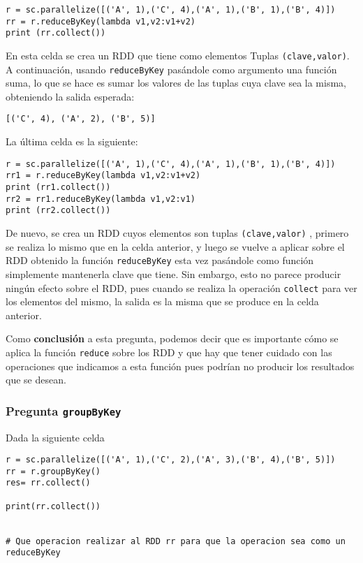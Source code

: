 \documentclass[11pt]{article}
\def\inline{\lstinline[basicstyle=\ttfamily,keywordstyle={}]}
\begin{document}
\begin{verbatim}
r = sc.parallelize([('A', 1),('C', 4),('A', 1),('B', 1),('B', 4)])
rr = r.reduceByKey(lambda v1,v2:v1+v2)
print (rr.collect())
\end{verbatim}

En esta celda se crea un RDD que tiene como elementos Tuplas \inline{(clave,valor)}. A continuación, usando \inline{reduceByKey} pasándole como argumento una función suma, lo que se hace es sumar los valores de las tuplas cuya clave sea la misma, obteniendo la salida esperada:
\begin{verbatim}
[('C', 4), ('A', 2), ('B', 5)]
\end{verbatim}

La última celda es la siguiente:
\begin{verbatim}
r = sc.parallelize([('A', 1),('C', 4),('A', 1),('B', 1),('B', 4)])
rr1 = r.reduceByKey(lambda v1,v2:v1+v2)
print (rr1.collect())
rr2 = rr1.reduceByKey(lambda v1,v2:v1)
print (rr2.collect())
\end{verbatim}

De nuevo, se crea un RDD cuyos elementos son tuplas \inline{(clave,valor)} , primero se realiza lo mismo que en la celda anterior, y luego se vuelve a aplicar sobre el RDD obtenido la función \inline{reduceByKey} esta vez pasándole como función simplemente mantenerla clave que tiene. Sin embargo, esto no parece producir ningún efecto sobre el RDD, pues cuando se realiza la operación \inline{collect} para ver los elementos del mismo, la salida es la misma que se produce en la celda anterior.

Como \textbf{conclusión} a esta pregunta, podemos decir que es importante cómo se aplica la función \inline{reduce} sobre los RDD y que hay que tener cuidado con las operaciones que indicamos a esta función pues podrían no producir los resultados que se desean. 

\subsubsection*{ Pregunta \inline{groupByKey}}

Dada la siguiente celda
\begin{verbatim}
r = sc.parallelize([('A', 1),('C', 2),('A', 3),('B', 4),('B', 5)])
rr = r.groupByKey()
res= rr.collect()

print(rr.collect())


# Que operacion realizar al RDD rr para que la operacion sea como un reduceByKey
\end{verbatim}
\end{document}
